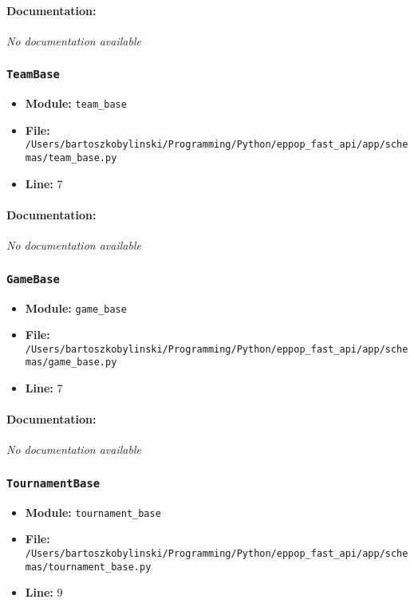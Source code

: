 \documentclass[11pt,a4paper]{article}
\begin{document}
\paragraph{Documentation:} \textit{No documentation available}


\vspace{1em}
\subsubsection{\texttt{TeamBase}}

\begin{itemize}
    \item \textbf{Module:} \texttt{team\_base}
    \item \textbf{File:} \texttt{/Users/bartoszkobylinski/Programming/Python/eppop\_fast\_api/app/schemas/team\_base.py}
    \item \textbf{Line:} 7
\end{itemize}

\paragraph{Documentation:} \textit{No documentation available}


\vspace{1em}
\subsubsection{\texttt{GameBase}}

\begin{itemize}
    \item \textbf{Module:} \texttt{game\_base}
    \item \textbf{File:} \texttt{/Users/bartoszkobylinski/Programming/Python/eppop\_fast\_api/app/schemas/game\_base.py}
    \item \textbf{Line:} 7
\end{itemize}

\paragraph{Documentation:} \textit{No documentation available}


\vspace{1em}
\subsubsection{\texttt{TournamentBase}}

\begin{itemize}
    \item \textbf{Module:} \texttt{tournament\_base}
    \item \textbf{File:} \texttt{/Users/bartoszkobylinski/Programming/Python/eppop\_fast\_api/app/schemas/tournament\_base.py}
    \item \textbf{Line:} 9
\end{itemize}
\end{document}
